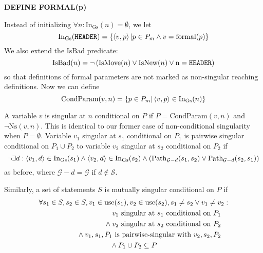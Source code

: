 \documentclass[11pt,notitlepage]{article}
\begin{document}
\textbf{DEFINE FORMAL(p)}

Instead of initializing $\forall n :
\text{In}_\text{Gs}(n)=\emptyset$, we let
\begin{displaymath}
\text{In}_\text{Gs}(\text{\tt HEADER}) =
   \left\{ \left\langle v,p \right\rangle | p\in P_m \wedge v=\text{formal}(p) \right\}
\end{displaymath}
We also extend the $\text{IsBad}$ predicate:
\begin{displaymath}
\text{IsBad}(n) = \neg\left(\text{IsMove}(n) \vee \text{IsNew}(n) \vee
                            \text n = \text{\tt HEADER} \right)
\end{displaymath}
so that definitions of formal parameters are not marked as
non-singular reaching definitions.  Now we can define
\begin{displaymath}
\text{CondParam}(v,n) =
    \left\{ p\in P_m | \left\langle v,p \right\rangle\in \text{In}_\text{Gs}(n) \right\}
\end{displaymath}

A variable $v$ is singular at $n$ conditional on $P$ if
$P=\text{CondParam}(v,n)$ and $\neg\text{Ns}(v,n)$.  This
is identical to our former case of non-conditional singularity
when $P=\emptyset$.  Variable $v_1$ singular at $s_1$ conditional on
$P_1$ is pairwise singular conditional on $P_1\cup P_2$ to variable
$v_2$ singular at $s_2$ conditional on $P_2$ if
\begin{displaymath}
\neg\exists 
     d : \left\langle v_1, d \right\rangle \in \text{In}_\text{Gs}(s_1) \wedge
         \left\langle v_2, d \right\rangle \in \text{In}_\text{Gs}(s_2) \wedge
\left(\text{Path}_{\mathcal{G}-d}(s_1, s_2) \vee
      \text{Path}_{\mathcal{G}-d}(s_2, s_1) \right)
\end{displaymath}
as before, where $\mathcal{G}-d=\mathcal{G}$ if $d\notin\mathcal{S}$.

Similarly, a set of statements $S$ is mutually singular conditional on $P$
if
\begin{multline*}
\forall s_1 \in S, s_2 \in S, v_1 \in \text{use}(s_1), v_2 \in \text{use}(s_2),
  s_1 \neq s_2 \vee v_1 \neq v_2:
\\\shoveright{
v_1 \text{ singular at } s_1 \text{ conditional on } P_1
}\\\shoveright{{}\wedge
v_2 \text{ singular at } s_2 \text{ conditional on } P_2
}\\\shoveright{{}\wedge
v_1,s_1,P_1
\text{ is pairwise-singular with }
v_2,s_2,P_2
}\\{}\wedge
P_1 \cup P_2 \subseteq P
\end{multline*}
\end{document}
